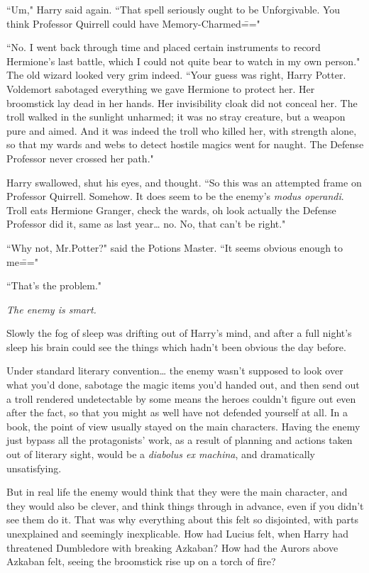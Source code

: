 ``Um," Harry said again. ``That spell seriously ought to be Unforgivable. You think Professor Quirrell could have Memory-Charmed\==="

``No. I went back through time and placed certain instruments to record Hermione's last battle, which I could not quite bear to watch in my own person." The old wizard looked very grim indeed. ``Your guess was right, Harry Potter. Voldemort sabotaged everything we gave Hermione to protect her. Her broomstick lay dead in her hands. Her invisibility cloak did not conceal her. The troll walked in the sunlight unharmed; it was no stray creature, but a weapon pure and aimed. And it was indeed the troll who killed her, with strength alone, so that my wards and webs to detect hostile magics went for naught. The Defense Professor never crossed her path."

Harry swallowed, shut his eyes, and thought. ``So this was an attempted frame on Professor Quirrell. Somehow. It does seem to be the enemy's \emph{modus operandi}. Troll eats Hermione Granger, check the wards, oh look actually the Defense Professor did it, same as last year{\ldots} no. No, that can't be right."

``Why not, Mr.\?Potter?" said the Potions Master. ``It seems obvious enough to me\==="

``That's the problem."

\emph{The enemy is smart.}

Slowly the fog of sleep was drifting out of Harry's mind, and after a full night's sleep his brain could see the things which hadn't been obvious the day before.

Under standard literary convention{\ldots} the enemy wasn't supposed to look over what you'd done, sabotage the magic items you'd handed out, and then send out a troll rendered undetectable by some means the heroes couldn't figure out even after the fact, so that you might as well have not defended yourself at all. In a book, the point of view usually stayed on the main characters. Having the enemy just bypass all the protagonists' work, as a result of planning and actions taken out of literary sight, would be a \emph{diabolus ex machina}, and dramatically unsatisfying.

But in real life the enemy would think that they were the main character, and they would also be clever, and think things through in advance, even if you didn't see them do it. That was why everything about this felt so disjointed, with parts unexplained and seemingly inexplicable. How had Lucius felt, when Harry had threatened Dumbledore with breaking Azkaban? How had the Aurors above Azkaban felt, seeing the broomstick rise up on a torch of fire?

